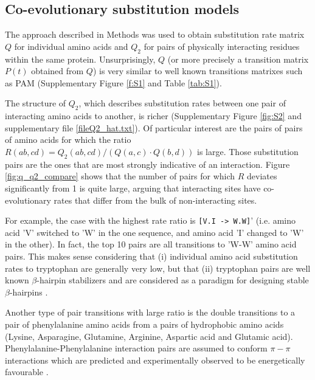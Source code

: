 \subsection{Co-evolutionary substitution models}

The approach described in Methods was used to obtain substitution rate matrix $Q$ for individual amino acids and $Q_2$ for pairs of physically interacting residues within the same protein. Unsurprisingly, $Q$ (or more precisely a transition matrix $P(t)$ obtained from $Q$) is very similar to well known transitions matrixes such as PAM \cite{} (Supplementary Figure \ref{f:S1} and Table \ref{tab:S1}).


The structure of $Q_2$, which describes substitution rates between one pair of interacting amino acids to another, is richer (Supplementary Figure \ref{fig:S2} and supplementary file \ref{fileQ2_hat.txt}). Of particular interest are the pairs of pairs of amino acids for which the ratio $R(ab,cd) = Q_2 (ab, cd) / ( Q(a,c) \cdot Q(b,d) )$ is large. Those substitution pairs are the ones that are most strongly indicative of an interaction. Figure \ref{fig:q_q2_compare} shows that the number of pairs for which $R$ deviates significantly from 1 is quite large, arguing that interacting sites have co-evolutionary rates that differ from the bulk of non-interacting sites.

For example, the case with the highest rate ratio is \texttt{[V.I -> W.W]}' (i.e. amino acid 'V' switched to 'W' in the one sequence, and amino acid 'I' changed to 'W' in the other). In fact, the top 10 pairs are all transitions to 'W-W' amino acid pairs. This makes sense considering that (i) individual amino acid substitution rates to tryptophan are generally very low, but that (ii) tryptophan pairs are well known $\beta$-hairpin stabilizers and are considered as a paradigm for designing stable $\beta$-hairpins \cite{santiveri2010tryptophan}.

Another type of pair transitions with large ratio is the double transitions to a pair of phenylalanine amino acids from a pairs of hydrophobic amino acids (Lysine, Asparagine, Glutamine, Arginine, Aspartic acid and Glutamic acid). Phenylalanine-Phenylalanine interaction pairs are assumed to conform $\pi-\pi$ interactions which are predicted and experimentally observed to be energetically favourable \cite{hunter1991pi}.

